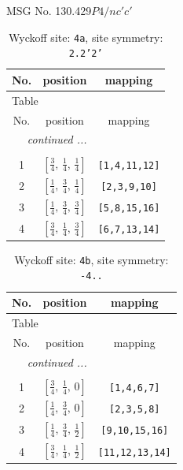 \documentclass[fleqn,8pt]{jsarticle}
\begin{document}
\setcounter{MaxMatrixCols}{32}

\renewcommand{\tablename}{Table~}
\renewcommand{\figurename}{Figure~}
\begin{center}
\LARGE
MSG No. 130.429\quad$P4/nc'c'$
\end{center}
\renewcommand{\arraystretch}{1.2}
\begin{longtable}{ccc}
\caption{Wyckoff site: {\tt 4a}, site symmetry: {\tt 2.2'2'}}
 \\
 \hline \hline
No. & position & mapping \\ \hline \endfirsthead

\multicolumn{2}{l}{\tablename\ \thetable{}} \\
 \hline \hline
No. & position & mapping \\ \hline \endhead

 \hline \hline
\multicolumn{2}{r}{\footnotesize\it continued ...} \\ \endfoot

 \hline \hline
\multicolumn{2}{r}{} \\ \endlastfoot

1 & $\left[ \frac{3}{4},\, \frac{1}{4},\, \frac{1}{4} \right]$ & {\tt [1,4,11,12]} \\ \hline
2 & $\left[ \frac{1}{4},\, \frac{3}{4},\, \frac{1}{4} \right]$ & {\tt [2,3,9,10]} \\ \hline
3 & $\left[ \frac{1}{4},\, \frac{3}{4},\, \frac{3}{4} \right]$ & {\tt [5,8,15,16]} \\ \hline
4 & $\left[ \frac{3}{4},\, \frac{1}{4},\, \frac{3}{4} \right]$ & {\tt [6,7,13,14]} \\
\end{longtable}
\renewcommand{\arraystretch}{1.2}
\begin{longtable}{ccc}
\caption{Wyckoff site: {\tt 4b}, site symmetry: {\tt -4..}}
 \\
 \hline \hline
No. & position & mapping \\ \hline \endfirsthead

\multicolumn{2}{l}{\tablename\ \thetable{}} \\
 \hline \hline
No. & position & mapping \\ \hline \endhead

 \hline \hline
\multicolumn{2}{r}{\footnotesize\it continued ...} \\ \endfoot

 \hline \hline
\multicolumn{2}{r}{} \\ \endlastfoot

1 & $\left[ \frac{3}{4},\, \frac{1}{4},\, 0 \right]$ & {\tt [1,4,6,7]} \\ \hline
2 & $\left[ \frac{1}{4},\, \frac{3}{4},\, 0 \right]$ & {\tt [2,3,5,8]} \\ \hline
3 & $\left[ \frac{1}{4},\, \frac{3}{4},\, \frac{1}{2} \right]$ & {\tt [9,10,15,16]} \\ \hline
4 & $\left[ \frac{3}{4},\, \frac{1}{4},\, \frac{1}{2} \right]$ & {\tt [11,12,13,14]} \\
\end{longtable}
\end{document}
